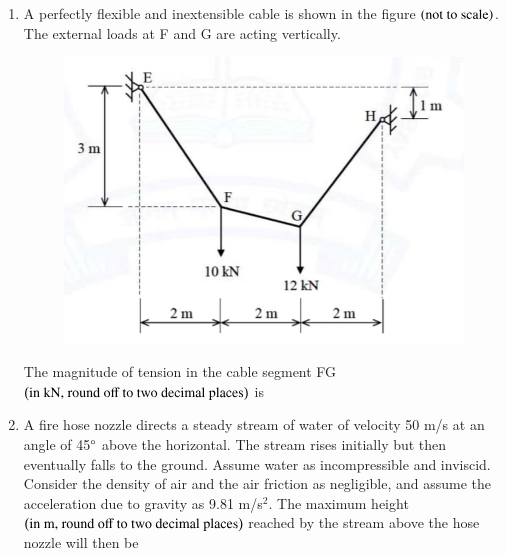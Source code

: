 \documentclass[journal,12pt,onecolumn]{article}
\theoremstyle{remark}
\begin{document}
\begin{enumerate}
\hfill{}

\item A perfectly flexible and inextensible cable is shown in the figure  $\left(\text{not to scale}\right)$. The external loads at F and G are acting vertically.
\begin{figure}[H]
    \centering
    \includegraphics[width=0.7\columnwidth]{figs/2q39.jpg}
    \caption{}
    \label{fig:q39}
\end{figure}
The magnitude of tension in the cable segment FG $\left(\text{in kN, round off to two decimal places}\right)$ is \underline{\hspace{2cm}}

\hfill{}

\item A fire hose nozzle directs a steady stream of water of velocity 50 m/s at an angle of 45$\degree$ above the horizontal. The stream rises initially but then eventually falls to the ground. Assume water as incompressible and inviscid. Consider the density of air and the air friction as negligible, and assume the acceleration due to gravity as 9.81 m/s$^2$. The maximum height $\left(\text{in m, round off to two decimal places}\right)$ reached by the stream above the hose nozzle will then be \underline{\hspace{2cm}}

\hfill{}


\end{enumerate}
\end{document}
